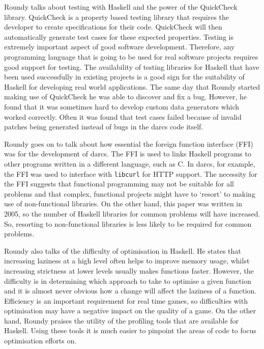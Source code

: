 Roundy talks about testing with Haskell and the power of the QuickCheck library.
QuickCheck is a property based testing library that requires the developer to
create specifications for their code. QuickCheck will then automatically generate
test cases for these expected properties.\cite{claessen2000} Testing is extremely
important aspect of good software development. Therefore, any programming language
that is going to be used for real software projects requires good support for
testing. The availability of testing libraries for Haskell that have been used
successfully in existing projects is a good sign for the suitability of Haskell
for developing real world applications. The same day that Roundy started making
use of QuickCheck he was able to discover and fix a bug. However, he found that
it was sometimes hard to develop custom data generators which worked correctly.
Often it was found that test cases failed because of invalid patches being generated
instead of bugs in the darcs code itself.

Roundy goes on to talk about how essential the foreign function interface (FFI)
was for the development of darcs. The FFI is used to links Haskell programs to
other programs written in a different language, such as C. In darcs, for example,
the FFI was used to interface with \texttt{libcurl} for HTTP support. The necessity
for the FFI suggests that functional programming may not be suitable for all problems
and that complex, functional projects might have to `resort' to making use of
non-functional libraries. On the other hand, this paper was written in 2005, so
the number of Haskell libraries for common problems will have increased. So,
resorting to non-functional libraries is less likely to be required for common
problems.

Roundy also talks of the difficulty of optimisation in Haskell. He states that
increasing laziness at a high level often helps to improve memory usage, whilst
increasing strictness at lower levels usually makes functions faster. However,
the difficulty is in determining which approach to take to optimise a given
function and it is almost never obvious how a change will affect the laziness
of a function. Efficiency is an important requirement for real time games, so
difficulties with optimisation may have a negative impact on the quality of a
game. On the other hand, Roundy praises the utility of the profiling tools that
are available for Haskell. Using these tools it is much easier to pinpoint the
areas of code to focus optimisation efforts on.

